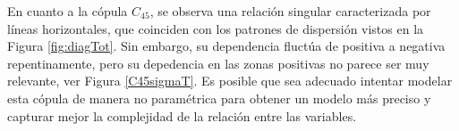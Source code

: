 En cuanto a la cópula $C_45$, se observa una relación singular caracterizada por líneas horizontales, que coinciden con los patrones de dispersión vistos en la Figura \ref{fig:diagTot}. Sin embargo, su dependencia fluctúa de positiva a negativa repentinamente, pero su depedencia en las zonas positivas no parece ser muy relevante, ver Figura \ref{C45sigmaT}. Es posible que sea adecuado intentar modelar esta cópula de manera no paramétrica para obtener un modelo más preciso y capturar mejor la complejidad de la relación entre las variables.


\begin{figure}[H]
 \centering
\end{figure}

